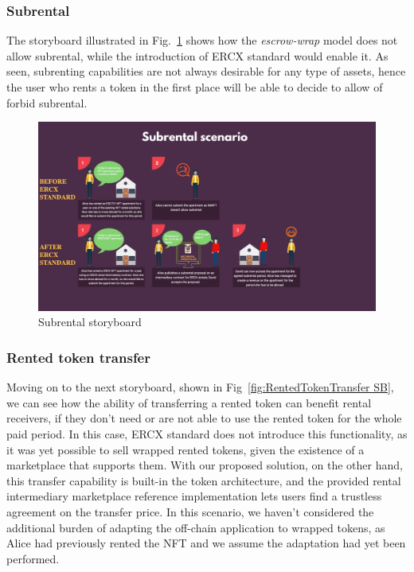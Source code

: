\documentclass[english, LaM, oneside]{sapthesis}%
\begin{document}
\subsubsection{Subrental}
The storyboard illustrated in Fig.~\ref{fig:Subrental SB} shows how the \textit{escrow-wrap} model does not allow subrental, while the introduction of ERCX standard would enable it. As seen, subrenting capabilities are not always desirable for any type of assets, hence the user who rents a token in the first place will be able to decide to allow of forbid subrental.

\begin{figure}
    \centering
        \begin{adjustbox}{width=1\textwidth}
            \includegraphics{storyboards/subrental.pdf}
        \end{adjustbox}
    \caption{Subrental storyboard}
    \label{fig:Subrental SB}
\end{figure}

\subsubsection{Rented token transfer}
Moving on to the next storyboard, shown in Fig~\ref{fig:RentedTokenTransfer SB}, we can see how the ability of transferring a rented token can benefit rental receivers, if they don't need or are not able to use the rented token for the whole paid period. In this case, ERCX standard does not introduce this functionality, as it was yet possible to sell wrapped rented tokens, given the existence of a marketplace that supports them. With our proposed solution, on the other hand, this transfer capability is built-in the token architecture, and the provided rental intermediary marketplace reference implementation lets users find a trustless agreement on the transfer price. \newline
In this scenario, we haven't considered the additional burden of adapting the off-chain application to wrapped tokens, as Alice had previously rented the NFT and we assume the adaptation had yet been performed.
\end{document}
